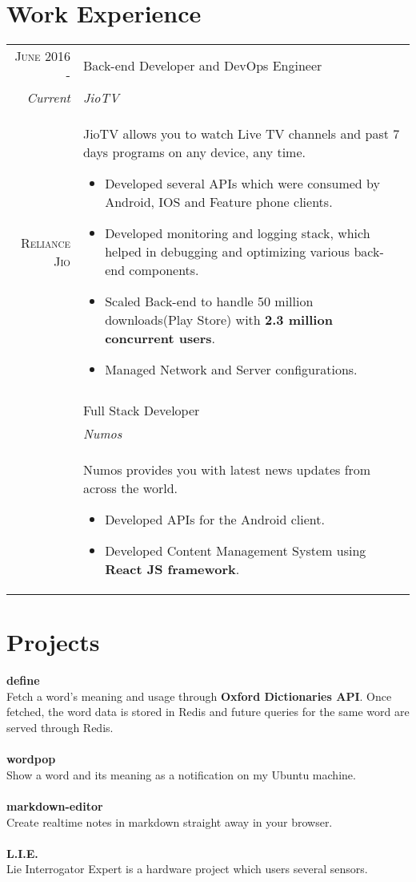 \documentclass[a4paper,10pt]{article}
\begin{document}
\section{Work Experience}
\begin{tabular}{r|p{11cm}}
 \textsc{June 2016 -} & Back-end Developer and DevOps Engineer \\\emph{Current}&\emph{JioTV}\\\textsc{Reliance Jio}&\footnotesize{JioTV allows you to watch Live TV channels and past 7 days programs on any device, any time. 
 \begin{itemize} 
 \item Developed several APIs which were consumed by Android, IOS and Feature phone clients.
 \item Developed monitoring and logging stack, which helped in debugging and optimizing various back-end components. 
 \item Scaled Back-end to handle 50 million downloads(Play Store) with \textbf{2.3 million concurrent users}. 
 \item Managed Network and Server configurations.
  \end{itemize}} \\
 \\
 \emph{} & Full Stack Developer \\\textsc{}&
 \emph{Numos}\\&\footnotesize{Numos provides you with latest news updates from across the world. 
 \begin{itemize}
 \item Developed APIs for the Android client. 
 \item Developed Content Management System using \textbf{React JS framework}.
 \end{itemize}
 } \\
\end{tabular}

\section{Projects} 

 \textbf{define}\\
 Fetch a word's meaning and usage through \textbf{Oxford Dictionaries API}. Once fetched, the word data is stored in Redis and future queries for the same word are served through Redis.\\
 \\
 \textbf{wordpop}\\
 Show a word and its meaning as a notification on my Ubuntu machine.\\
 \\
 \textbf{markdown-editor}\\
 Create realtime notes in markdown straight away in your browser.\\
 \\
 \textbf{L.I.E.}\\
 Lie Interrogator Expert is a hardware project which users several sensors.
 
\end{document}
